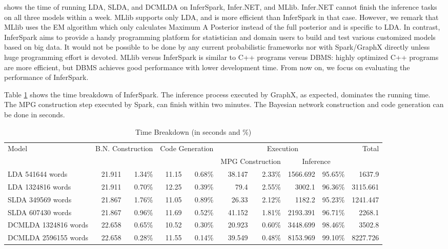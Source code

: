 shows the time of running LDA, SLDA, and DCMLDA 
on InferSpark, Infer.NET, and MLlib.
Infer.NET cannot finish the inference tasks on all three models within a week.
MLlib supports only LDA, and is more efficient than InferSpark in that case.
However, we remark that MLlib uses the EM algorithm which only
calculates Maximum A Posterior instead of the full posterior and is specific to LDA.
In contrast, InferSpark aims to provide a handy programming platform for statistician and domain users to build and test various customized models based on big data.
It would not be possible to be done by any current probabilistic frameworks nor with Spark/GraphX directly unless huge programming effort is devoted.  
MLlib versus InferSpark 
is similar to C++ programs versus DBMS: highly optimized C++ programs are more efficient, 
but DBMS achieves good performance with lower development time.
From now on, we focus on evaluating the performance of InferSpark.



Table \ref{breakdown} shows the time breakdown of InferSpark.
The inference process executed by GraphX, as expected, dominates the running time.
The MPG construction step executed by Spark, can finish within two minutes.
The Bayesian network construction and code generation can be done in seconds.


\begin{table}
\caption{Time Breakdown (in seconds and \%)}
\label{breakdown}
\small
\begin{tabular}{|l||*{8}{r|}r|}
\hline
Model & \multicolumn{2}{c|}{B.N. Construction} & \multicolumn{2}{c|}{Code Generation}	& \multicolumn{4}{c|}{Execution} & Total \\\cline{6-9} 
  & \multicolumn{2}{c|}{ } & \multicolumn{2}{c|}{ }	& \multicolumn{2}{c|}{MPG Construction} & \multicolumn{2}{c|}{Inference} &	 \\ \hline \hline
LDA 541644 words	& 21.911	& 1.34\%	& 11.15 &	0.68\%	& 38.147	& 2.33\% &	1566.692 & 95.65\%	& 1637.9 \\ \hline
LDA 1324816 words &	21.911 & 0.70\% & 12.25	& 0.39\% & 79.4 & 2.55\%	& 3002.1 & 96.36\% &	3115.661 \\ \hline
SLDA 349569 words &	21.867 & 1.76\% & 11.05 &	0.89\%	& 26.33 & 2.12\% &	1182.2	& 95.23\%	& 1241.447 \\ \hline
SLDA 607430 words & 21.867 & 0.96\%	& 11.69	& 0.52\% & 41.152	& 1.81\%	& 2193.391	& 96.71\%	& 2268.1 \\ \hline
DCMLDA 1324816 words & 22.658 & 0.65\%	& 10.52 & 0.30\% &	20.923	& 0.60\% & 3448.699	& 98.46\% &	3502.8 \\ \hline
DCMLDA 2596155 words & 22.658 & 0.28\% & 11.55 & 0.14\%	& 39.549 & 0.48\%	& 8153.969 & 99.10\%	& 8227.726 \\ \hline

\end{tabular}
\end{table} 





